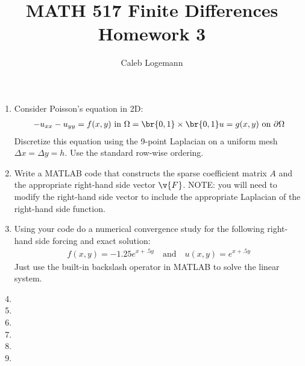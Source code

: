 \documentclass[11pt, oneside, titlepage]{article}
\title{MATH 517 Finite Differences Homework 3}
\author{Caleb Logemann}
\begin{document}
\maketitle

%
\begin{enumerate}
    \item %
        Consider Poisson's equation in 2D:
        \begin{align*}
            -u_{xx} - u_{yy} = f(x,y)\text{ in } \Omega = \br{0, 1} \times \br{0, 1}
            u = g(x,y)\text{ on } \partial\Omega
        \end{align*}
        Discretize this equation using the 9-point Laplacian on a uniform mesh
        $\Delta x = \Delta y = h$.
        Use the standard row-wise ordering.



    \item %
        Write a MATLAB code that constructs the sparse coefficient matrix $A$
        and the appropriate right-hand side vector $\v{F}$.
        NOTE: you will need to modify the right-hand side vector to include
        the appropriate Laplacian of the right-hand side function.

    \item %
        Using your code do a numerical convergence study for the following
        right-hand side forcing and exact solution:
        \begin{align*}
            f(x,y) = -1.25e^{x + .5y}\quad\text{and}\quad u(x,y) = e^{x + .5y}
        \end{align*}
        Just use the built-in backslash operator in MATLAB to solve the linear
        system.

    \item %
    \item %
    \item %
    \item %
    \item %
    \item %
\end{enumerate}
\end{document}
